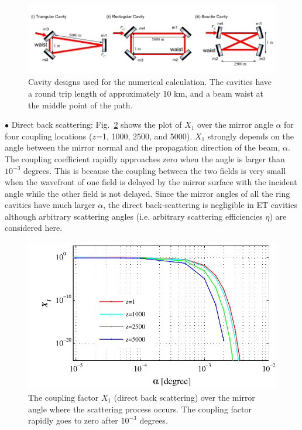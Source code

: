 \begin{figure}
\centering
\includegraphics[scale =1]{./Sec_Optics/geo-summary.pdf}
\caption{Cavity designs used for the numerical calculation.
The cavities have a round trip length of approximately
10 km, and a beam waist at the middle point of the path.}
\label{fig:geo-summary}
\end{figure}


$\bullet$  Direct back scattering:
Fig.~\ref{fig:scat-plot-1} shows the plot of $X_1$ over the mirror angle $\alpha$
for four coupling locations ($z$=1, 1000, 2500, {\rm and} 5000).
$X_1$ strongly depends on the angle between
the mirror normal and the propagation direction of the beam, $\alpha$.
The coupling coefficient rapidly approaches zero
when the angle is larger than $10^{-3}$ degrees.
This is because the coupling between the two fields is
very small when the wavefront of one field is delayed
by the mirror surface with the incident angle while the other field is not delayed.
Since the mirror angles of all the ring cavities have much larger $\alpha$,
the direct back-scattering is negligible in ET cavities
although arbitrary scattering angles
(i.e. arbitrary scattering efficiencies $\eta$) are considered here.



\begin{figure}
\centering
\includegraphics[scale =.7]{./Sec_Optics/scat-plot-1.pdf}
\caption{The coupling factor $X_1$ (direct back scattering) over the mirror angle
where the scattering process occurs.
The coupling factor rapidly goes to zero after $10^{-3}$ degrees.}
\label{fig:scat-plot-1}
\end{figure}

